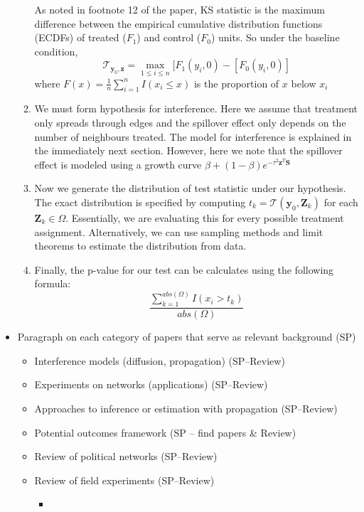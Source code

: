 \documentclass[12pt]{article}
\begin{document}
\begin{itemize}
\begin{enumerate}
As noted in footnote 12 of the paper, KS statistic is the maximum difference between the empirical cumulative distribution functions (ECDFs) of treated ($F_1$) and control ($F_0$) units. So under the baseline condition, $$\mathcal{T}_{\textbf{y}_0, \textbf{z}} = \max\limits_{1\leq i\leq n} [F_{1}(y_i, 0) - [F_{0}(y_i, 0)]$$ where $F(x) = \frac{1}{n} \sum_{i=1}^{n} I(x_i  \leq x)$ is the proportion of $x$ below $x_i$

\item We must form hypothesis for interference. Here we assume that treatment only spreads through edges and the spillover effect only depends on the number of neighbours treated. The model for interference is explained in the immediately next section. However, here we note that the spillover effect is modeled using a growth curve $\beta + (1-\beta)e^{-\tau^2\textbf{z}^T\textbf{S}}$

\item Now we generate the distribution of test statistic under our hypothesis. The exact distribution is specified by computing $t_k = \mathcal{T} (\textbf{y}_0, \textbf{Z}_k)$ for each $\textbf{Z}_k \in \Omega$. Essentially, we are evaluating this for every possible treatment assignment. Alternatively, we can use sampling methods and limit theorems to estimate the distribution from data.

\item Finally, the p-value for our test can be calculates using the following formula: $$\frac{\sum_{k=1}^{abs(\Omega)} I(x_i  > t_k)}{abs(\Omega)}$$



\end{enumerate}


\item Paragraph on each category of papers that serve as relevant background (SP)
\begin{itemize}
\item Interference models (diffusion, propagation) (SP--Review)
\item  Experiments on networks (applications) (SP--Review)
\item Approaches to inference or estimation with propagation (SP--Review) 
\item Potential outcomes framework (SP -- find papers \& Review)
\item Review of political networks (SP--Review)
\item Review of field experiments (SP--Review)
\begin{itemize}
\item \citep{Gottlieb:2015,Alatas:2012,Kalla:2015, Malesky:2012,Ichino:2012,Nyhan:2014}
\end{itemize}
\end{itemize}
\end{itemize}
\end{document}
